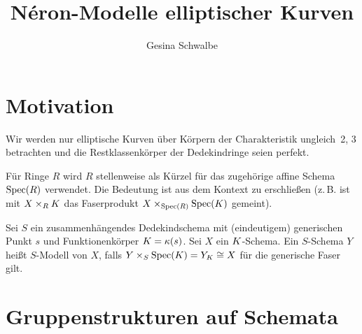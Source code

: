 \documentclass[german]{scrreprt}
\title{
  Néron-Modelle elliptischer Kurven
}
\author{Gesina Schwalbe}
\begin{document}
\maketitle
\tableofcontents

\chapter{Motivation}
Wir werden nur elliptische Kurven über Körpern der Charakteristik
ungleich~2, 3 betrachten und die Restklassenkörper der Dedekindringe
seien perfekt.

Für Ringe $R$ wird $R$ stellenweise als Kürzel für das zugehörige
affine Schema $\operatorname{Spec}(R)$ verwendet. Die Bedeutung ist aus dem Kontext
zu erschließen (z.\,B. ist mit $X\times_R K$ das Faserprodukt
$X\times_{\operatorname{Spec}(R)}\operatorname{Spec}(K)$ gemeint).

\begin{Definition}[$S$-Modell]
  Sei $S$ ein zusammenhängendes Dedekindschema mit (eindeutigem)
  generischen Punkt $s$ und Funktionenkörper $K=\kappa(s)$.
  Sei $X$ ein $K$-Schema.
  Ein $S$-Schema $Y$ heißt $S$-Modell von $X$, falls
  $Y\times_S\operatorname{Spec}(K)=Y_K\cong X$ für die generische Faser gilt.
\end{Definition}


\chapter{Gruppenstrukturen auf Schemata}
\end{document}
